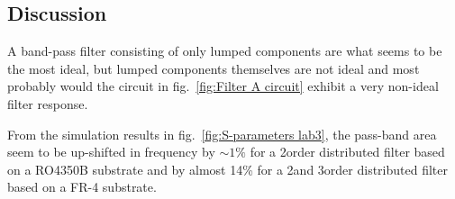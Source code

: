 \documentclass[report.tex]{subfiles}
\begin{document}
\subsection{Discussion}

A band-pass filter consisting of only lumped components are what seems to be the most ideal, but lumped components themselves are not ideal and most probably would the circuit in fig.~\ref{fig:Filter A circuit} exhibit a very non-ideal filter response.

From the simulation results in fig.~\ref{fig:S-parameters lab3}, the pass-band area seem to be up-shifted in frequency by $\sim 1\%$ for a 2\nd order distributed filter based on a RO4350B substrate and by almost 14\% for a 2\nd and 3\rd order distributed filter based on a FR-4 substrate.
\end{document}
